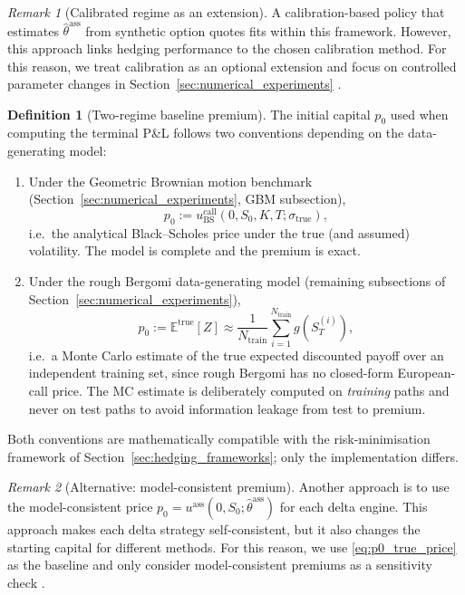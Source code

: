 \documentclass[12pt,a4paper]{article}
\theoremstyle{definition}
\newtheorem{definition}{Definition}[section]
\theoremstyle{plain}
\theoremstyle{remark}
\newtheorem{remark}{Remark}[section]
\theoremstyle{plain}
\begin{document}
\begin{remark}[Calibrated regime as an extension]
\label{rem:calibrated_regime_extension}
A calibration-based policy that estimates $\hat\theta^{\mathrm{ass}}$ from synthetic option quotes fits within this framework.
However, this approach links hedging performance to the chosen calibration method.
For this reason, we treat calibration as an optional extension and focus on controlled parameter changes in Section~\ref{sec:numerical_experiments} \cite{ElKaroui1998Robustness}.
\end{remark}

\label{subsubsec:initial_capital_policy}

\begin{definition}[Two-regime baseline premium]\label{def:two_regime_premium}
The initial capital $p_0$ used when computing the terminal P\&L follows two conventions depending on the data-generating model:
\begin{enumerate}
    \item Under the Geometric Brownian motion benchmark (Section~\ref{sec:numerical_experiments}, GBM subsection),
    \[
    p_0 := u_{\mathrm{BS}}^{\mathrm{call}}(0, S_0, K, T; \sigma_{\mathrm{true}}),
    \]
    i.e.\ the analytical Black--Scholes price under the true (and assumed) volatility. The model is complete and the premium is exact.

    \item Under the rough Bergomi data-generating model (remaining subsections of Section~\ref{sec:numerical_experiments}),
    \begin{equation}
    \label{eq:p0_true_price}
    p_0 := \mathbb{E}^{\mathrm{true}}[Z] \approx \frac{1}{N_{\mathrm{train}}} \sum_{i=1}^{N_{\mathrm{train}}} g\!\left(S_T^{(i)}\right),
    \end{equation}
    i.e.\ a Monte Carlo estimate of the true expected discounted payoff over an independent training set, since rough Bergomi has no closed-form European-call price. The MC estimate is deliberately computed on \emph{training} paths and never on test paths to avoid information leakage from test to premium.
\end{enumerate}
Both conventions are mathematically compatible with the risk-minimisation framework of Section~\ref{sec:hedging_frameworks}; only the implementation differs.
\end{definition}

\begin{remark}[Alternative: model-consistent premium]
\label{rem:p0_model_consistent}
Another approach is to use the model-consistent price $p_0=u^{\mathrm{ass}}(0,S_0;\hat\theta^{\mathrm{ass}})$ for each delta engine.
This approach makes each delta strategy self-consistent, but it also changes the starting capital for different methods.
For this reason, we use \eqref{eq:p0_true_price} as the baseline and only consider model-consistent premiums as a sensitivity check \cite{ElKaroui1998Robustness}.
\end{remark}
\end{document}
